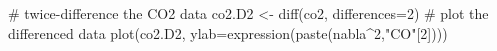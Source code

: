 \begin{Schunk}
\begin{Sinput}
 # twice-difference the CO2 data
 co2.D2 <- diff(co2, differences=2)
 # plot the differenced data
 plot(co2.D2, ylab=expression(paste(nabla^2,"CO"[2])))
\end{Sinput}
\end{Schunk}
